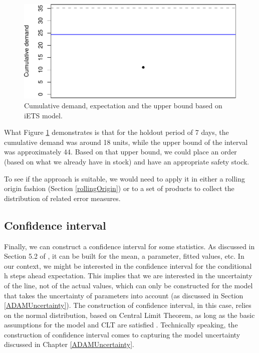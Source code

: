 \documentclass[
]{book}
\theoremstyle{definition}
\theoremstyle{definition}
\theoremstyle{definition}
\theoremstyle{definition}
\theoremstyle{remark}
\begin{document}
\begin{figure}
\centering
\includegraphics{Svetunkov--2022----ADAM_files/figure-latex/adamModeliETSCumulative-1.pdf}
\caption{\label{fig:adamModeliETSCumulative}Cumulative demand, expectation and the upper bound based on iETS model.}
\end{figure}

What Figure \ref{fig:adamModeliETSCumulative} demonstrates is that for the holdout period of 7 days, the cumulative demand was around 18 units, while the upper bound of the interval was approximately 44. Based on that upper bound, we could place an order (based on what we already have in stock) and have an appropriate safety stock.

To see if the approach is suitable, we would need to apply it in either a rolling origin fashion (Section \ref{rollingOrigin}) or to a set of products to collect the distribution of related error measures.

\hypertarget{confidence-interval}{%
\subsection{Confidence interval}\label{confidence-interval}}

Finally, we can construct a confidence interval for some statistics. As discussed in Section 5.2 of \citet{SvetunkovSBA}, it can be built for the mean, a parameter, fitted values, etc. In our context, we might be interested in the confidence interval for the conditional h steps ahead expectation. This implies that we are interested in the uncertainty of the line, not of the actual values, which can only be constructed for the model that takes the uncertainty of parameters into account (as discussed in Section \ref{ADAMUncertainty}). The construction of confidence interval, in this case, relies on the normal distribution, based on Central Limit Theorem, as long as the basic assumptions for the model and CLT are satisfied \citep[see Section 4.2 and Chapter 12 of][]{SvetunkovSBA}. Technically speaking, the construction of confidence interval comes to capturing the model uncertainty discussed in Chapter \ref{ADAMUncertainty}.
\end{document}

